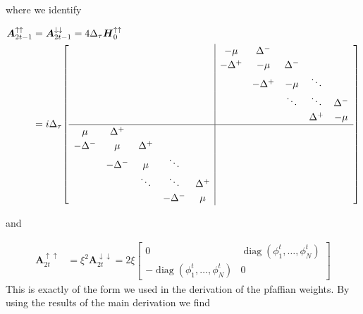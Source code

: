 \documentclass{article}
\begin{document}
where we identify

\begin{align}
	\boldsymbol{A}_{2t-1}^{\uparrow\uparrow} &= \boldsymbol{A}^{\downarrow\downarrow}_{2t-1} = 4\Delta_\tau \boldsymbol{H}_0^{\uparrow\uparrow}\\ 
	&=   i\Delta_\tau{\renewcommand{\arraystretch}{1.2}
		\setlength{\arraycolsep}{5pt}
		\left[
		\begin{array}{*{5}{c}|*{5}{c}}
			& \phantom{-} &  &  &  & -\mu & \Delta^{-}  &  &  &  \\
			&  & \phantom{-} &  &  & -\Delta^{+} & -\mu & \Delta^{-} &  &  \\
			&  &  &  &  &  & -\Delta^{+} & -\mu & \ddots &  \\
			&  &  &  & \phantom{-} &  &  & \ddots & \ddots & \Delta^{-} \\
			&  &  &  &  &  &  &  & \Delta^{+} & -\mu \\
			\hline
			\mu & \Delta^{+}  &  &  &  &  &  &  &  &  \\
			-\Delta^{-}& \mu & \Delta^{+} &  &  &  & &  &  &  \\
			&-\Delta^{-}  & \mu & \ddots &  &  &  &  &  &  \\
			&  & \ddots  & \ddots & \Delta^{+} &  &  &  &  &  \\
			&  &  & -\Delta^{-} & \mu &  &  &  & & 
		\end{array}
		\right]}
\end{align}

and

\begin{align}
	\boldsymbol{A}_{2t}^{\uparrow\uparrow}&=\xi^2\boldsymbol{A}_{2t}^{\downarrow\downarrow} = 2\xi \begin{bmatrix}
		0 & \operatorname{diag}\!\left(\phi^{t}_{1}, \ldots, \phi^{t}_{N}\right) \\
		-\operatorname{diag}\!\left(\phi^{t}_{1}, \ldots, \phi^{t}_{N}\right) & 0
	\end{bmatrix} 
\end{align}
This is exactly of the form we used in the derivation of the pfaffian weights. By using the results of the main derivation we find
\end{document}
